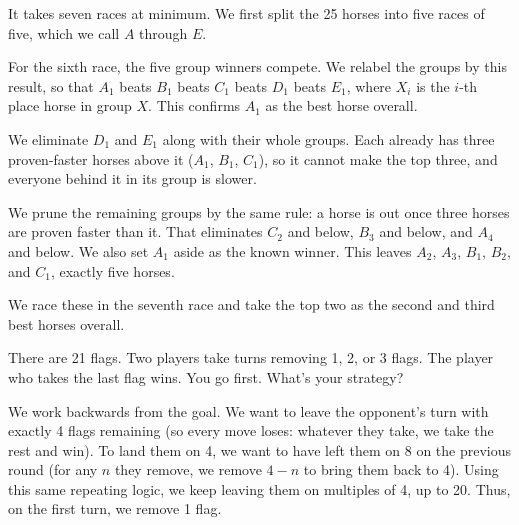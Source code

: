 \begin{solution}
It takes seven races at minimum. We first split the 25 horses into five races of five, which we call $A$ through $E$.

For the sixth race, the five group winners compete. We relabel the groups by this result, so that $A_1$ beats $B_1$ beats $C_1$ beats $D_1$ beats $E_1$, where $X_i$ is the $i$-th place horse in group $X$. This confirms $A_1$ as the best horse overall.

We eliminate $D_1$ and $E_1$ along with their whole groups. Each already has three proven-faster horses above it ($A_1$, $B_1$, $C_1$), so it cannot make the top three, and everyone behind it in its group is slower.

We prune the remaining groups by the same rule: a horse is out once three horses are proven faster than it. That eliminates $C_2$ and below, $B_3$ and below, and $A_4$ and below. We also set $A_1$ aside as the known winner. This leaves $A_2$, $A_3$, $B_1$, $B_2$, and $C_1$, exactly five horses.

We race these in the seventh race and take the top two as the second and third best horses overall.
\end{solution}

\newpage

\begin{problem}
There are 21 flags. Two players take turns removing 1, 2, or 3 flags. The player who takes the last flag wins. You go first. What's your strategy?
\end{problem}

\begin{solution}
We work backwards from the goal. We want to leave the opponent's turn with exactly 4 flags remaining (so every move loses: whatever they take, we take the rest and win). To land them on 4, we want to have left them on 8 on the previous round (for any $n$ they remove, we remove $4-n$ to bring them back to 4). Using this same repeating logic, we keep leaving them on multiples of 4, up to 20. Thus, on the first turn, we remove 1 flag.
\end{solution}

